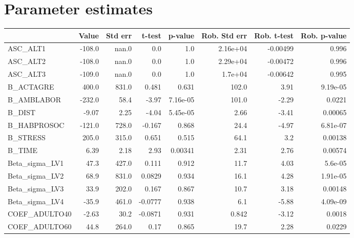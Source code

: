 \section{Parameter estimates}
\begin{tabular}{lrrrrrrr}
\toprule
{} &  Value &  Std err &  t-test &  p-value &  Rob. Std err &  Rob. t-test &  Rob. p-value \\
\midrule
ASC\_ALT1         & -108.0 &    nan.0 &     0.0 &      1.0 &      2.16e+04 &     -0.00499 &         0.996 \\
ASC\_ALT2         & -108.0 &    nan.0 &     0.0 &      1.0 &      2.29e+04 &     -0.00472 &         0.996 \\
ASC\_ALT3         & -109.0 &    nan.0 &     0.0 &      1.0 &       1.7e+04 &     -0.00642 &         0.995 \\
B\_ACTAGRE        &  400.0 &    831.0 &   0.481 &    0.631 &         102.0 &         3.91 &      9.19e-05 \\
B\_AMBLABOR       & -232.0 &     58.4 &   -3.97 & 7.16e-05 &         101.0 &        -2.29 &        0.0221 \\
B\_DIST           &  -9.07 &     2.25 &   -4.04 & 5.45e-05 &          2.66 &        -3.41 &       0.00065 \\
B\_HABPROSOC      & -121.0 &    728.0 &  -0.167 &    0.868 &          24.4 &        -4.97 &      6.81e-07 \\
B\_STRESS         &  205.0 &    315.0 &   0.651 &    0.515 &          64.1 &          3.2 &       0.00138 \\
B\_TIME           &   6.39 &     2.18 &    2.93 &  0.00341 &          2.31 &         2.76 &       0.00574 \\
Beta\_sigma\_LV1   &   47.3 &    427.0 &   0.111 &    0.912 &          11.7 &         4.03 &       5.6e-05 \\
Beta\_sigma\_LV2   &   68.9 &    831.0 &  0.0829 &    0.934 &          16.1 &         4.28 &      1.91e-05 \\
Beta\_sigma\_LV3   &   33.9 &    202.0 &   0.167 &    0.867 &          10.7 &         3.18 &       0.00148 \\
Beta\_sigma\_LV4   &  -35.9 &    461.0 & -0.0777 &    0.938 &           6.1 &        -5.88 &      4.09e-09 \\
COEF\_ADULTO40    &  -2.63 &     30.2 & -0.0871 &    0.931 &         0.842 &        -3.12 &        0.0018 \\
COEF\_ADULTO60    &   44.8 &    264.0 &    0.17 &    0.865 &          19.7 &         2.28 &        0.0229 \\

\end{tabular}
